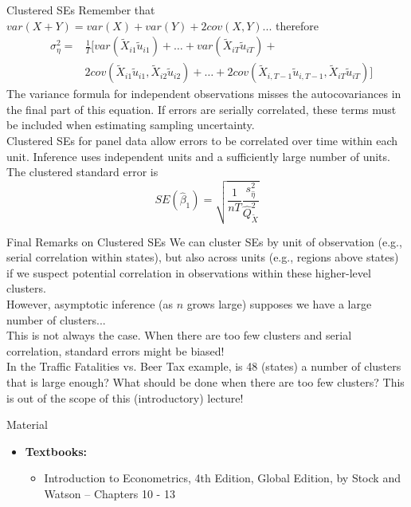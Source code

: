 \documentclass[notes,10pt, aspectratio=169]{beamer}
\begin{document}
\begin{frame}{Clustered SEs}
Remember that $var(X + Y) = var(X) + var(Y) + 2cov(X,Y)$... therefore
\begin{eqnarray*}
    &\sigma_\eta^2 = &\frac{1}{T} \Big[var(\tilde{X}_{i1} \tilde{u}_{i1})+\dots+ var(\tilde{X}_{iT} \tilde{u}_{iT}) +\\
    & &2cov(\tilde{X}_{i1} \tilde{u}_{i1}, \tilde{X}_{i2} \tilde{u}_{i2}) + \dots + 2cov(\tilde{X}_{i,T-1} \tilde{u}_{i,T-1}, \tilde{X}_{iT} \tilde{u}_{iT}) \Big]
\end{eqnarray*}
The variance formula for independent observations misses the autocovariances in the final part of this equation. If errors are serially correlated, these terms must be included when estimating sampling uncertainty.\\[1em]

Clustered SEs for panel data allow errors to be correlated over time within each unit. Inference uses independent units and a sufficiently large number of units.\\[1em]

The clustered standard error is
\begin{equation*}
    SE(\hat{\beta}_1)=\sqrt{\frac{1}{nT}\frac{s_{\hat{\eta}}^2}{\hat{Q}_{\tilde{X}}^2}}
\end{equation*}

\end{frame}

\begin{frame}{Final Remarks on Clustered SEs}
We can cluster SEs by unit of observation (e.g., serial correlation within states), but also across units (e.g., regions above states) if we suspect potential correlation in observations within these higher-level clusters.\\[1em]

However, asymptotic inference (as $n$ grows large) supposes we have a large number of clusters...\\[1em]%

This is not always the case. When there are too few clusters and serial correlation, standard errors might be biased!\\[1em]

In the Traffic Fatalities vs. Beer Tax example, is 48 (states) a number of clusters that is large enough? What should be done when there are too few clusters? This is out of the scope of this (introductory) lecture!
\end{frame}


\begin{frame}[allowframebreaks]{Material}
\begin{itemize}
    \item[--] \textbf{Textbooks:}
    \begin{itemize}
        \item Introduction to Econometrics, 4th Edition, Global Edition, by Stock and Watson -- Chapters 10 - 13
    \end{itemize}
\end{itemize}
\end{frame}
\end{document}
